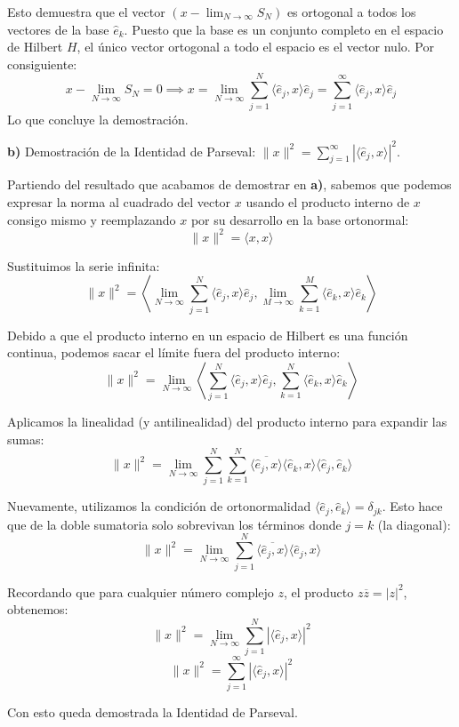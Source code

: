 \documentclass[11pt,spanish]{article}
\begin{document}
Esto demuestra que el vector $(x - \lim_{N \to \infty} S_N)$ es ortogonal a todos los vectores de la base $\hat{e}_k$. Puesto que la base es un conjunto completo en el espacio de Hilbert $H$, el único vector ortogonal a todo el espacio es el vector nulo. Por consiguiente:
$$x - \lim_{N \to \infty} S_N = 0 \implies x = \lim_{N \to \infty} \sum_{j=1}^N \langle \hat{e}_j, x \rangle \hat{e}_j = \sum_{j=1}^{\infty} \langle \hat{e}_j, x \rangle \hat{e}_j$$
Lo que concluye la demostración.

\vspace{0.5cm}
{\bf b)} Demostración de la Identidad de Parseval: $\|x\|^2 = \sum_{j=1}^{\infty} |\langle \hat{e}_j, x \rangle|^2$.

Partiendo del resultado que acabamos de demostrar en {\bf a)}, sabemos que podemos expresar la norma al cuadrado del vector $x$ usando el producto interno de $x$ consigo mismo y reemplazando $x$ por su desarrollo en la base ortonormal:
$$\|x\|^2 = \langle x, x \rangle$$

Sustituimos la serie infinita:
$$\|x\|^2 = \left\langle \lim_{N \to \infty} \sum_{j=1}^N \langle \hat{e}_j, x \rangle \hat{e}_j , \lim_{M \to \infty} \sum_{k=1}^M \langle \hat{e}_k, x \rangle \hat{e}_k \right\rangle$$

Debido a que el producto interno en un espacio de Hilbert es una función continua, podemos sacar el límite fuera del producto interno:
$$\|x\|^2 = \lim_{N \to \infty} \left\langle \sum_{j=1}^N \langle \hat{e}_j, x \rangle \hat{e}_j , \sum_{k=1}^N \langle \hat{e}_k, x \rangle \hat{e}_k \right\rangle$$

Aplicamos la linealidad (y antilinealidad) del producto interno para expandir las sumas:
$$\|x\|^2 = \lim_{N \to \infty} \sum_{j=1}^N \sum_{k=1}^N \overline{\langle \hat{e}_j, x \rangle} \langle \hat{e}_k, x \rangle \langle \hat{e}_j, \hat{e}_k \rangle$$

Nuevamente, utilizamos la condición de ortonormalidad $\langle \hat{e}_j, \hat{e}_k \rangle = \delta_{jk}$. Esto hace que de la doble sumatoria solo sobrevivan los términos donde $j = k$ (la diagonal):
$$\|x\|^2 = \lim_{N \to \infty} \sum_{j=1}^N \overline{\langle \hat{e}_j, x \rangle} \langle \hat{e}_j, x \rangle$$

Recordando que para cualquier número complejo $z$, el producto $z \overline{z} = |z|^2$, obtenemos:
$$\|x\|^2 = \lim_{N \to \infty} \sum_{j=1}^N |\langle \hat{e}_j, x \rangle|^2$$
$$\|x\|^2 = \sum_{j=1}^{\infty} |\langle \hat{e}_j, x \rangle|^2$$

Con esto queda demostrada la Identidad de Parseval.
\end{document}
